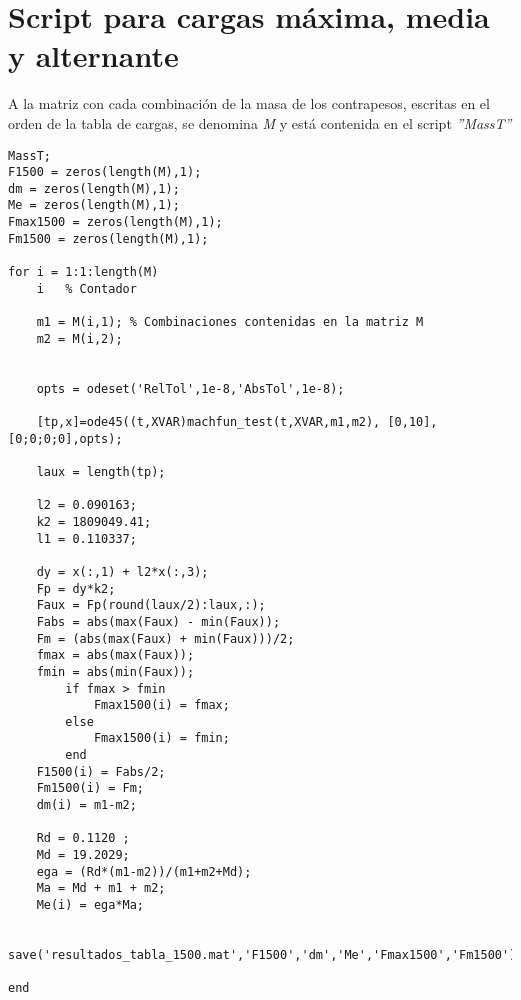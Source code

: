 \section{Script para cargas máxima, media y alternante}
\label{sec:sol_gen}
A la matriz con cada combinación de la masa de los contrapesos, escritas en el orden de la tabla de cargas, se denomina \textit{M} y está contenida en el script \textit{''MassT''}
\begin{lstlisting}
MassT;
F1500 = zeros(length(M),1);
dm = zeros(length(M),1);
Me = zeros(length(M),1);
Fmax1500 = zeros(length(M),1);
Fm1500 = zeros(length(M),1);

for i = 1:1:length(M)
    i	% Contador

    m1 = M(i,1); % Combinaciones contenidas en la matriz M
    m2 = M(i,2);
    
    
    opts = odeset('RelTol',1e-8,'AbsTol',1e-8);

    [tp,x]=ode45((t,XVAR)machfun_test(t,XVAR,m1,m2), [0,10],[0;0;0;0],opts);

    laux = length(tp);
        
    l2 = 0.090163;
    k2 = 1809049.41;
    l1 = 0.110337;
        
    dy = x(:,1) + l2*x(:,3);
    Fp = dy*k2;
    Faux = Fp(round(laux/2):laux,:); 
    Fabs = abs(max(Faux) - min(Faux));
    Fm = (abs(max(Faux) + min(Faux)))/2;
    fmax = abs(max(Faux));
    fmin = abs(min(Faux));
        if fmax > fmin
            Fmax1500(i) = fmax;
        else
            Fmax1500(i) = fmin;
        end
    F1500(i) = Fabs/2;
    Fm1500(i) = Fm;
    dm(i) = m1-m2;
    
    Rd = 0.1120 ;  
    Md = 19.2029;   
    ega = (Rd*(m1-m2))/(m1+m2+Md);
    Ma = Md + m1 + m2;
    Me(i) = ega*Ma;
    
    save('resultados_tabla_1500.mat','F1500','dm','Me','Fmax1500','Fm1500');
    
end
\end{lstlisting}